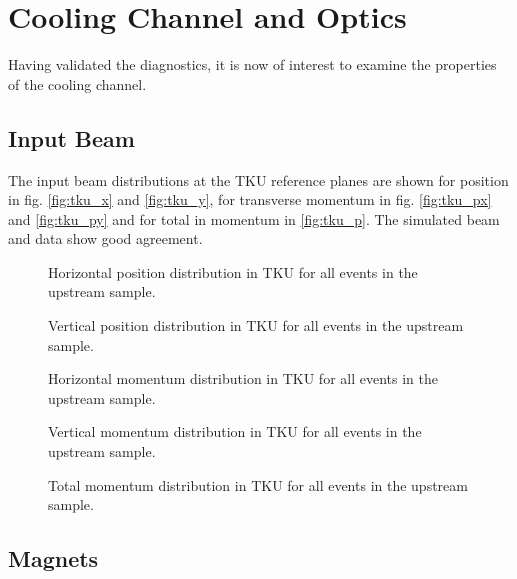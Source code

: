 \section{Cooling Channel and Optics}
\label{Sect:CoolingChannel}

Having validated the diagnostics, it is now of interest to examine the properties
of the cooling channel.

\subsection{Input Beam}

The input beam distributions at the TKU reference planes are shown for position 
in fig. \ref{fig:tku_x} and \ref{fig:tku_y}, for transverse momentum in
fig. \ref{fig:tku_px} and \ref{fig:tku_py} and for total in momentum in
\ref{fig:tku_p}. The simulated beam and data show good agreement.

\begin{figure}[!tbh]
    \centering
    {Horizontal position distribution in TKU for all events in the upstream sample.}
\end{figure}

\begin{figure}[!tbh]
    \centering
    {Vertical position distribution in TKU for all events in the upstream sample.}
\end{figure}

\begin{figure}[!tbh]
    \centering
    {Horizontal momentum distribution in TKU for all events in the upstream sample.}
\end{figure}

\begin{figure}[!tbh]
    \centering
    {Vertical momentum distribution in TKU for all events in the upstream sample.}
\end{figure}

\begin{figure}[!tbh]
    \centering
    {Total momentum distribution in TKU for all events in the upstream sample.}
\end{figure}

\clearpage

\subsection{Magnets}

